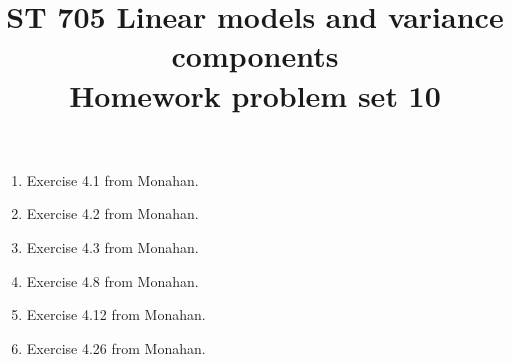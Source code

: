 \documentclass[11pt]{article}
\title{ST 705 Linear models and variance components \\ 
        Homework problem set 10}
\begin{document}
\maketitle

\begin{enumerate}

\item Exercise 4.1 from Monahan.

\item Exercise 4.2 from Monahan.

\item Exercise 4.3 from Monahan.

\item Exercise 4.8 from Monahan.

\item Exercise 4.12 from Monahan.

\item Exercise 4.26 from Monahan.


\end{enumerate}
\end{document}
